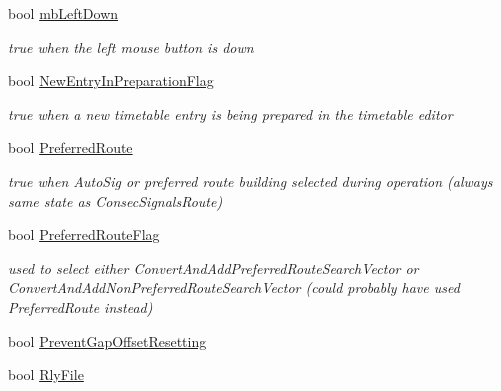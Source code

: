 \begin{DoxyCompactItemize}
\mbox{\label{class_t_interface_a1bc1b96388de989a60a3956542997a5c}} 
bool \mbox{\hyperlink{class_t_interface_a1bc1b96388de989a60a3956542997a5c}{mb\+Left\+Down}}
\begin{DoxyCompactList}\small\item\em true when the left mouse button is down \end{DoxyCompactList}\item 
\mbox{\label{class_t_interface_a2d1ea52d1197b3230f27ec36fd8c8958}} 
bool \mbox{\hyperlink{class_t_interface_a2d1ea52d1197b3230f27ec36fd8c8958}{New\+Entry\+In\+Preparation\+Flag}}
\begin{DoxyCompactList}\small\item\em true when a new timetable entry is being prepared in the timetable editor \end{DoxyCompactList}\item 
\mbox{\label{class_t_interface_a9f563db8457e4a0e49efee58b599727d}} 
bool \mbox{\hyperlink{class_t_interface_a9f563db8457e4a0e49efee58b599727d}{Preferred\+Route}}
\begin{DoxyCompactList}\small\item\em true when Auto\+Sig or preferred route building selected during operation (always same state as Consec\+Signals\+Route) \end{DoxyCompactList}\item 
\mbox{\label{class_t_interface_a5f12b79138dc1ee380ce943155803f67}} 
bool \mbox{\hyperlink{class_t_interface_a5f12b79138dc1ee380ce943155803f67}{Preferred\+Route\+Flag}}
\begin{DoxyCompactList}\small\item\em used to select either Convert\+And\+Add\+Preferred\+Route\+Search\+Vector or Convert\+And\+Add\+Non\+Preferred\+Route\+Search\+Vector (could probably have used Preferred\+Route instead) \end{DoxyCompactList}\item 
bool \mbox{\hyperlink{class_t_interface_ae6c305a014fd20195a90258578a7bcee}{Prevent\+Gap\+Offset\+Resetting}}
\item 
\mbox{\label{class_t_interface_a67ddeb310249c10a71362e45dff7c07a}} 
bool \mbox{\hyperlink{class_t_interface_a67ddeb310249c10a71362e45dff7c07a}{Rly\+File}}

\end{DoxyCompactItemize}

